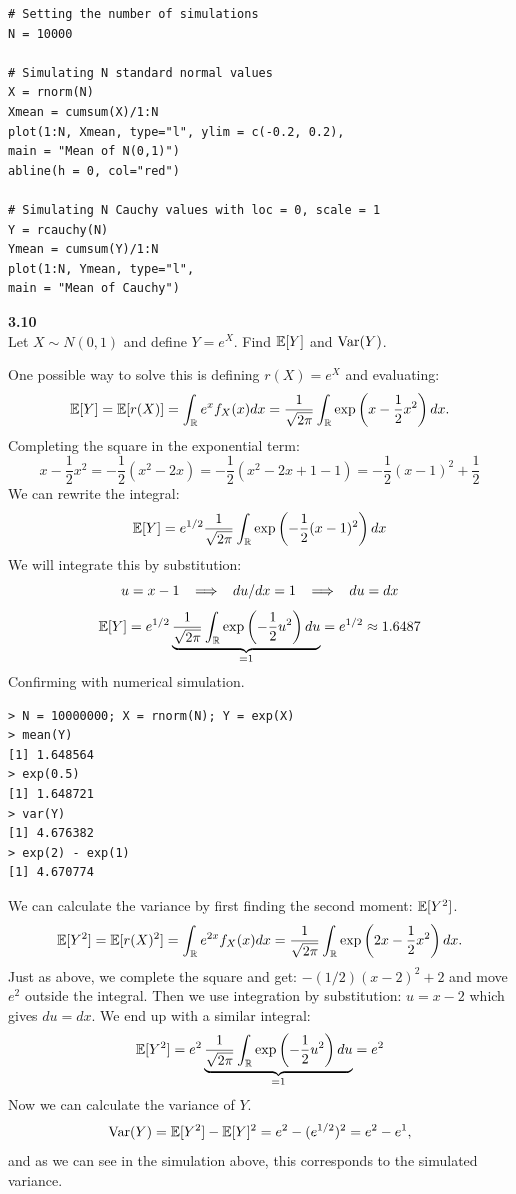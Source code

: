 \begin{lstlisting}[style=RSyntax, title=R]
# Setting the number of simulations
N = 10000

# Simulating N standard normal values
X = rnorm(N)
Xmean = cumsum(X)/1:N
plot(1:N, Xmean, type="l", ylim = c(-0.2, 0.2),
main = "Mean of N(0,1)")
abline(h = 0, col="red")

# Simulating N Cauchy values with loc = 0, scale = 1
Y = rcauchy(N)
Ymean = cumsum(Y)/1:N
plot(1:N, Ymean, type="l",
main = "Mean of Cauchy")
\end{lstlisting}

\newpage\noindent
\textbf{3.10}\\  %
Let $X\sim N(0,1)$ and define $Y = e^X$. Find $\mathbb{E}[Y]$ and $\text{Var}(Y)$.

\medskip\noindent
One possible way to solve this is defining $r(X) = e^X$ and evaluating:
$$
\mathbb{E}[Y] = \mathbb{E}[r(X)] = \int_{\mathbb{R}} e^xf_X(x)dx
= \frac{1}{\sqrt{2\pi}}\int_{\mathbb{R}} \exp\left(x - \frac{1}{2}x^2\right)dx.
$$
Completing the square in the exponential term:
$$
x - \frac{1}{2}x^2 = -\frac{1}{2}\left(x^2 - 2x\right)
= -\frac{1}{2}\left(x^2 - 2x + 1 - 1\right)
= -\frac{1}{2}\left(x - 1\right)^2 + \frac{1}{2}
$$
We can rewrite the integral:
$$
\mathbb{E}[Y] = e^{1/2}\frac{1}{\sqrt{2\pi}}\int_{\mathbb{R}} \exp\left(-\frac{1}{2}(x - 1)^2\right)dx
$$
We will integrate this by substitution:
$$
u = x-1 \;\;\implies\;\; du/dx = 1 \;\;\implies\;\; du = dx
$$
$$
\mathbb{E}[Y] = e^{1/2}\underbrace{\frac{1}{\sqrt{2\pi}}\int_{\mathbb{R}} \exp\left(-\frac{1}{2}u^2\right)du}_{=1}
= e^{1/2} \approx 1.6487
$$
Confirming with numerical simulation.
\begin{lstlisting}[style=RSyntax]
> N = 10000000; X = rnorm(N); Y = exp(X)
> mean(Y)
[1] 1.648564
> exp(0.5)
[1] 1.648721
> var(Y)
[1] 4.676382
> exp(2) - exp(1)
[1] 4.670774
\end{lstlisting}
We can calculate the variance by first finding the second moment: $\mathbb{E}[Y^2]$.
$$
\mathbb{E}[Y^2] = \mathbb{E}[r(X)^2] = \int_{\mathbb{R}} e^{2x}f_X(x)dx
= \frac{1}{\sqrt{2\pi}}\int_{\mathbb{R}} \exp\left(2x - \frac{1}{2}x^2\right)dx.
$$
Just as above, we complete the square and get: $-(1/2)(x - 2)^2 + 2$ and move $e^2$ outside the integral. Then
we use integration by substitution: $u = x - 2$ which gives $du = dx$. We end up with a similar integral: 
$$
\mathbb{E}[Y^2] = e^{2}\underbrace{\frac{1}{\sqrt{2\pi}}\int_{\mathbb{R}} \exp\left(-\frac{1}{2}u^2\right)du}_{=1}
= e^{2}
$$
Now we can calculate the variance of $Y$.
$$
\text{Var}(Y) = \mathbb{E}[Y^2] - \mathbb{E}[Y]^2 = e^2 - (e^{1/2})^2 = e^2 - e^1,
$$
and as we can see in the simulation above, this corresponds to the simulated variance.

